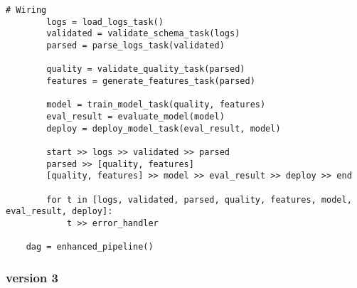 \begin{lstlisting}[caption={Airflow DAG with parallel data quality validation and feature engineering before training.}, label={lst:airflowdag_parallel}]
        # Wiring
        logs = load_logs_task()
        validated = validate_schema_task(logs)
        parsed = parse_logs_task(validated)
    
        quality = validate_quality_task(parsed)
        features = generate_features_task(parsed)
    
        model = train_model_task(quality, features)
        eval_result = evaluate_model(model)
        deploy = deploy_model_task(eval_result, model)
    
        start >> logs >> validated >> parsed
        parsed >> [quality, features]
        [quality, features] >> model >> eval_result >> deploy >> end
    
        for t in [logs, validated, parsed, quality, features, model, eval_result, deploy]:
            t >> error_handler
    
    dag = enhanced_pipeline()
\end{lstlisting}

    


\subsubsection{version 3}


